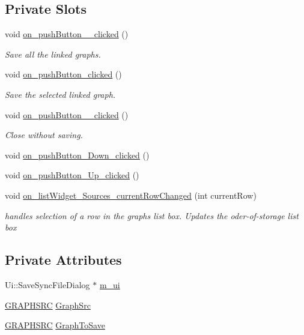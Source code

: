 \subsection*{Private Slots}
\begin{CompactItemize}
\item 
void \hyperlink{class_save_sync_file_dialog_1266fb9559a260bd06123a8f9d057c71}{on\_\-pushButton\_\_\-clicked} ()
\begin{CompactList}\small\item\em Save all the linked graphs. \item\end{CompactList}\item 
void \hyperlink{class_save_sync_file_dialog_5e3b844df3fe3b657e3fac9b590a690c}{on\_\-pushButton\_\-clicked} ()
\begin{CompactList}\small\item\em Save the selected linked graph. \item\end{CompactList}\item 
void \hyperlink{class_save_sync_file_dialog_d2c4963b1665d3c34636934a2d3260c9}{on\_\-pushButton\_\_\-clicked} ()
\begin{CompactList}\small\item\em Close without saving. \item\end{CompactList}\item 
void \hyperlink{class_save_sync_file_dialog_ac104e51524129c824ab1d30b8ae9e14}{on\_\-pushButton\_\-Down\_\-clicked} ()
\item 
void \hyperlink{class_save_sync_file_dialog_1cb3cdad261dd621d2d1e1d3a538fefb}{on\_\-pushButton\_\-Up\_\-clicked} ()
\item 
void \hyperlink{class_save_sync_file_dialog_d9d1632dcbc20ea628be9646e42a6d39}{on\_\-listWidget\_\-Sources\_\-currentRowChanged} (int currentRow)
\begin{CompactList}\small\item\em handles selection of a row in the graphs list box. Updates the oder-of-storage list box \item\end{CompactList}\end{CompactItemize}
\subsection*{Private Attributes}
\begin{CompactItemize}
\item 
Ui::SaveSyncFileDialog $\ast$ \hyperlink{class_save_sync_file_dialog_b95314c8667bb468a1edc52b3354057c}{m\_\-ui}
\item 
\hyperlink{savesyncfiledialog_8h_dc4594b144e880a867b5efe7979e0d35}{GRAPHSRC} \hyperlink{class_save_sync_file_dialog_3f2d0e497574670ff938db7db4490fe5}{GraphSrc}
\item 
\hyperlink{savesyncfiledialog_8h_dc4594b144e880a867b5efe7979e0d35}{GRAPHSRC} \hyperlink{class_save_sync_file_dialog_218cd59731116b00fefe8cd057a77747}{GraphToSave}
\end{CompactItemize}



